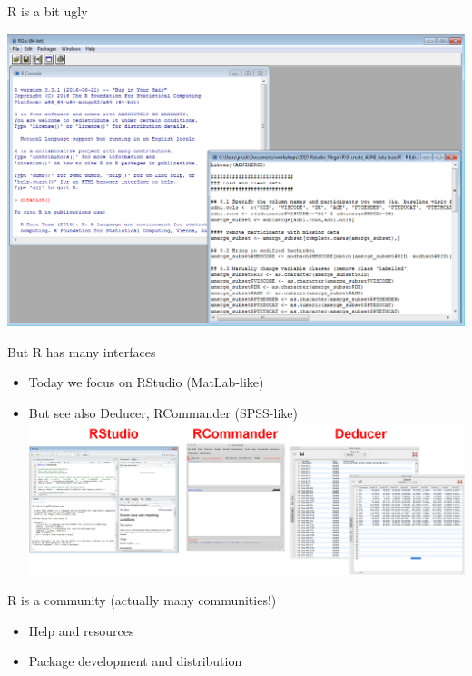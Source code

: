 \documentclass[
  ignorenonframetext,
]{beamer}
\providecommand{\tightlist}{%
  \setlength{\itemsep}{0pt}\setlength{\parskip}{0pt}}
\begin{document}
\begin{frame}{R is a bit ugly}
\protect\hypertarget{r-is-a-bit-ugly}{}

\includegraphics{../external/images/intro_rgui.PNG}

\end{frame}

\begin{frame}{But R has many interfaces}
\protect\hypertarget{but-r-has-many-interfaces}{}

\begin{itemize}
\tightlist
\item
  Today we focus on RStudio (MatLab-like)
\item
  But see also Deducer, RCommander (SPSS-like)
  \includegraphics{../external/images/intro_rgui_2.PNG}
\end{itemize}

\end{frame}

\begin{frame}{R is a community (actually many communities!)}
\protect\hypertarget{r-is-a-community-actually-many-communities}{}

\begin{itemize}
\tightlist
\item
  Help and resources
\item
  Package development and distribution
\end{itemize}

\end{frame}
\end{document}
